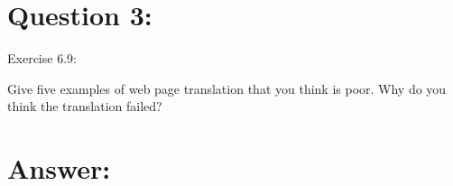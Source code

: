 \section*{Question 3:}
Exercise 6.9:

Give five examples of web page translation that you think is poor. Why do you think the translation failed?

\section*{Answer:}

